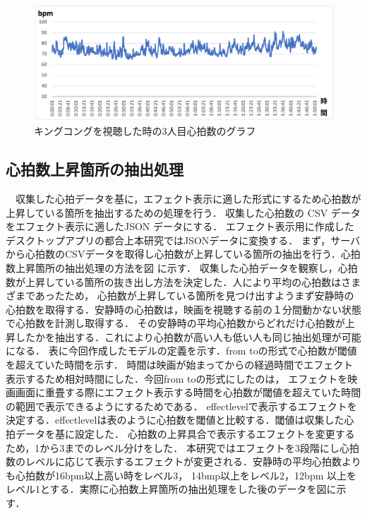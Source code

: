 \begin{figure}[H]
    \centering
    \includegraphics[width=14cm]{images/chapter3/gurafu1.png}
    \caption{キングコングを視聴した時の3人目心拍数のグラフ}
\end{figure}

\subsection{心拍数上昇箇所の抽出処理}
　収集した心拍データを基に，エフェクト表示に適した形式にするため心拍数が上昇している箇所を抽出するための処理を行う．
収集した心拍数の CSV データをエフェクト表示に適したJSON データにする．
エフェクト表示用に作成したデスクトップアプリの都合上本研究ではJSONデータに変換する．
まず，サーバから心拍数のCSVデータを取得し心拍数が上昇している箇所の抽出を行う．心拍数上昇箇所の抽出処理の方法を図 に示す．
収集した心拍データを観察し，心拍数が上昇している箇所の抜き出し方法を決定した．人により平均の心拍数はさまざまであったため，
心拍数が上昇している箇所を見つけ出すようまず安静時の心拍数を取得する．安静時の心拍数は，映画を視聴する前の１分間動かない状態で心拍数を計測し取得する．
その安静時の平均心拍数からどれだけ心拍数が上昇したかを抽出する．これにより心拍数が高い人も低い人も同じ抽出処理が可能になる．
表に今回作成したモデルの定義を示す．from toの形式で心拍数が閾値を超えていた時間を示す．
時間は映画が始まってからの経過時間でエフェクト表示するため相対時間にした．今回from toの形式にしたのは，
エフェクトを映画画面に重畳する際にエフェクト表示する時間を心拍数が閾値を超えていた時間の範囲で表示できるようにするためである．
effectlevelで表示するエフェクトを決定する．effectlevelは表のように心拍数を閾値と比較する．閾値は収集した心拍データを基に設定した．
心拍数の上昇具合で表示するエフェクトを変更するため，1から3までのレベル分けをした．
本研究ではエフェクトを3段階にし心拍数のレベルに応じて表示するエフェクトが変更される．安静時の平均心拍数よりも心拍数が16bpm以上高い時をレベル3，
14bmp以上をレベル2，12bpm 以上をレベル1とする．実際に心拍数上昇箇所の抽出処理をした後のデータを図に示す．


